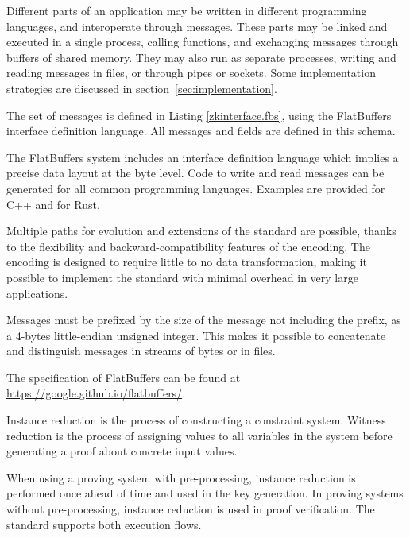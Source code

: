 
	Different parts of an application may be written in different programming languages, and interoperate through messages.
	These parts may be linked and executed in a single process, calling functions,
	and exchanging messages through buffers of shared memory.
	They may also run as separate processes, writing and reading messages in files, or through pipes or sockets.
	Some implementation strategies are discussed in section~\ref{sec:implementation}.


	The set of messages is defined in Listing \ref{zkinterface.fbs},
	using the FlatBuffers interface definition language.
	All messages and fields are defined in this schema.

	The FlatBuffers system includes an interface definition language
	which implies a precise data layout at the byte level.
	Code to write and read messages can be generated for all common programming languages.
	Examples are provided for C++ and for Rust.

	Multiple paths for evolution and extensions of the standard are possible,
	thanks to the flexibility and backward-compatibility features of the encoding.
	The encoding is designed to require little to no data transformation, making it possible
	to implement the standard with minimal overhead in very large applications.

	Messages must be prefixed by the size of the message not including the prefix,
	as a 4-bytes little-endian unsigned integer.
	This makes it possible to concatenate and distinguish messages
	in streams of bytes or in files.

	The specification of FlatBuffers can be found at
	\href{https://google.github.io/flatbuffers/}{https://google.github.io/flatbuffers/}.



	Instance reduction is the process of constructing a constraint system.
	Witness reduction is the process of assigning values to all variables
	in the system before generating a proof about concrete input values.

	When using a proving system with pre-processing, instance reduction
	is performed once ahead of time and used in the key generation.
	In proving systems without pre-processing, instance reduction is used in proof verification.
	The standard supports both execution flows.


